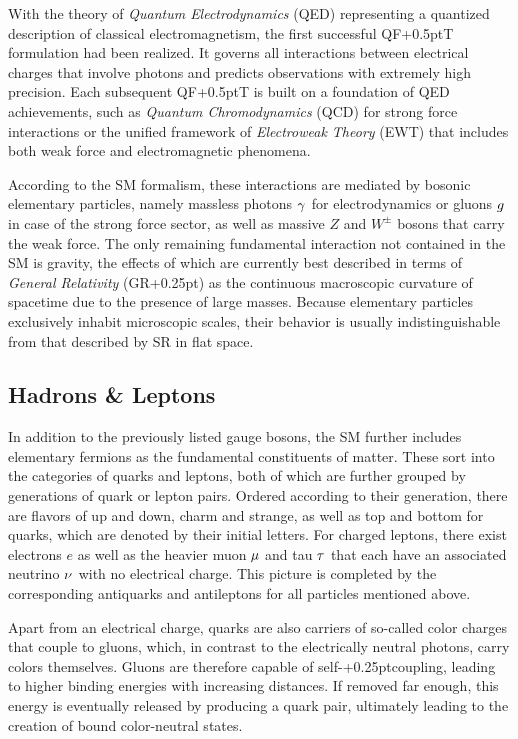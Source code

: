With the theory of \emph{Quantum Electrodynamics} (QED) representing a quantized description of classical electromagnetism, the
first successful QF{\kern+0.5pt}T formulation had been realized. It governs all interactions between electrical charges that involve
photons and predicts observations with extremely high precision. Each subsequent QF{\kern+0.5pt}T is built on a foundation of QED
achievements, such as \emph{Quantum Chromodynamics} (QCD) for strong force interactions or the unified framework of
\emph{Electroweak Theory} (EWT) that includes both weak force and electromagnetic phenomena.

According to the SM formalism, these interactions are mediated by bosonic elementary particles, namely massless photons
$\gamma \kern+0.75pt$ for electrodynamics or gluons $\kern-0.5pt g$ in case of the strong force sector, as well as massive
$Z$ and $W^\pm$ bosons that carry the weak force. The only remaining fundamental interaction not contained in the SM is gravity,
the effects of which are currently best described in terms of \emph{General Relativity} (GR{\kern+0.25pt}) as the continuous
macroscopic curvature of spacetime due to the presence of large masses. Because elementary particles exclusively inhabit
microscopic scales, their behavior is usually indistinguishable from that described by SR in flat space.


\subsection{Hadrons \& Leptons}
\label{sub:hadrons}

In addition to the previously listed gauge bosons, the SM further includes elementary fermions as the fundamental constituents of
matter. These sort into the categories of quarks and leptons, both of which are further grouped by generations of quark or lepton
pairs. Ordered according to their generation, there are flavors of up and down, charm and strange, as well as top and bottom for
quarks, which are denoted by their initial letters. For charged leptons, there exist electrons $e$ as well as the heavier muon
$\kern-0.5pt \mu$ and tau $\kern-0.5pt \tau \kern+0.5pt$ that each have an associated neutrino $\nu \kern+0.5pt$ with no electrical
charge. This picture is completed by the corresponding antiquarks and antileptons for all particles mentioned above.

Apart from an electrical charge, quarks are also carriers of so-called color charges that couple to gluons, which, in contrast
to the electrically neutral photons, carry colors themselves. Gluons are therefore capable of self-{\kern+0.25pt}coupling,
leading to higher binding energies with increasing distances. If removed far enough, this energy is eventually
released by producing a quark pair, ultimately leading to the creation of bound color-neutral states.

